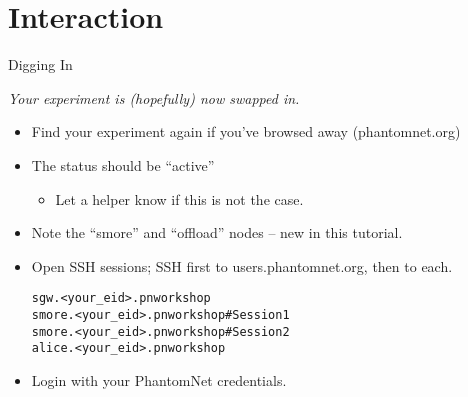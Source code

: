\documentclass[xcolor=pdftex,dvipsnames,table]{beamer}
\begin{document}
\section{Interaction}

\begin{frame}{Digging In}
  \centerline{\emph{Your experiment is (hopefully) now swapped in.}}
  \begin{itemize}
  \item Find your experiment again if you've browsed away (phantomnet.org)
  \item The status should be {\color{red}``active''}
    \begin{itemize}
      \item Let a helper know if this is not the case.
    \end{itemize}
  \item Note the ``smore'' and ``offload'' nodes -- new in this tutorial.
  \item Open SSH sessions; SSH first to {\color{blue}users.phantomnet.org}, then to each.
    \colorbox{SkyBlue!20}{
      \begin{minipage}{\textwidth}
        \begin{alltt}
          sgw.<your\_eid>.pnworkshop \newline
          smore.<your\_eid>.pnworkshop   \# Session 1 \newline
          smore.<your\_eid>.pnworkshop   \# Session 2 \newline
          alice.<your\_eid>.pnworkshop
        \end{alltt}
      \end{minipage}
    }
  \item Login with your PhantomNet credentials.
  \end{itemize}
\end{frame}
\end{document}
